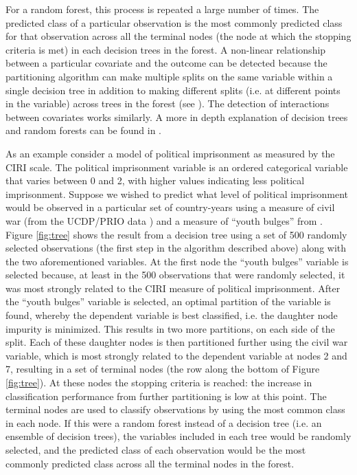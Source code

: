 \documentclass[12pt]{article}
\begin{document}
For a random forest, this process is repeated a large number of times. The predicted class of a particular observation is the most commonly predicted class for that observation across all the terminal nodes (the node at which the stopping criteria is met) in each decision trees in the forest.
A non-linear relationship between a particular covariate and the outcome can be detected because the partitioning algorithm can make multiple splits on the same variable within a single decision tree in addition to making different splits (i.e. at different points in the variable) across trees in the forest (see \citet{biau2008consistency}). The detection of interactions between covariates works similarly. A more in depth explanation of decision trees and random forests can be found in \citet{strobl2009introduction}. 

As an example consider a model of political imprisonment as measured by the CIRI scale. The political imprisonment variable is an ordered categorical variable that varies between 0 and 2, with higher values indicating less political imprisonment. Suppose we wished to predict what level of political imprisonment would be observed in a particular set of country-years using a measure of civil war (from the UCDP/PRIO data \citep{ThemnerWallensteen2012}) and a measure of ``youth bulges'' from \citet{NordasDavenport2013}. Figure \ref{fig:tree} shows the result from a decision tree using a set of 500 randomly selected observations (the first step in the algorithm described above) along with the two aforementioned variables. At the first node the ``youth bulges'' variable is selected because, at least in the 500 observations that were randomly selected, it was most strongly related to the CIRI measure of political imprisonment. After the ``youth bulges'' variable is selected, an optimal partition of the variable is found, whereby the dependent variable is best classified, i.e. the daughter node impurity is minimized. This results in two more partitions, on each side of the split. Each of these daughter nodes is then partitioned further using the civil war variable, which is most strongly related to the dependent variable at nodes 2 and 7, resulting in a set of terminal nodes (the row along the bottom of Figure \ref{fig:tree}). At these nodes the stopping criteria is reached: the increase in classification performance from further partitioning is low at this point. The terminal nodes are used to classify observations by using the most common class in each node. If this were a random forest instead of a decision tree (i.e. an ensemble of decision trees), the variables included in each tree would be randomly selected, and the predicted class of each observation would be the most commonly predicted class across all the terminal nodes in the forest.
\end{document}
